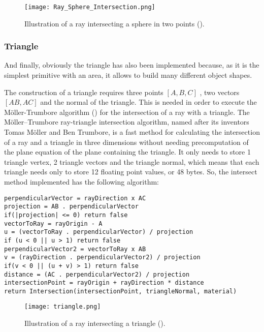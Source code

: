 \begin{figure}[H]
	\centering
	\caption{Illustration of a ray intersecting a sphere in two points (\cite{SphereRayIntersection}).}
	\label{Sphere.}
	\texttt{[image: Ray\_Sphere\_Intersection.png]}
\end{figure}

\subsubsection{Triangle}

\par
And finally, obviously the triangle has also been implemented because, as it is the simplest primitive with an area, it allows to build many different object shapes.

\par
The construction of a triangle requires three points
$[A, B, C]$
, two vectors
$[AB, AC]$
and the normal of the triangle.
This is needed in order to execute the Möller-Trumbore algorithm (\cite{RayTriangleIntersection}) for the intersection of a ray with a triangle.
The Möller–Trumbore ray-triangle intersection algorithm, named after its inventors Tomas Möller and Ben Trumbore, is a fast method for calculating the intersection of a ray and a triangle in three dimensions without needing precomputation of the plane equation of the plane containing the triangle.
It only needs to store 1 triangle vertex, 2 triangle vectors and the triangle normal, which means that each triangle needs only to store 12 floating point values, or 48 bytes.
So, the intersect method implemented has the following algorithm:

\begin{lstlisting}[caption={Algorithm of Ray triangle intersection (\cite{LightHouseRayTriangle})}, captionpos=b, label=Triangle]
perpendicularVector = rayDirection x AC
projection = AB . perpendicularVector
if(|projection| <= 0) return false
vectorToRay = rayOrigin - A
u = (vectorToRay . perpendicularVector) / projection
if (u < 0 || u > 1) return false
perpendicularVector2 = vectorToRay x AB
v = (rayDirection . perpendicularVector2) / projection
if(v < 0 || (u + v) > 1) return false
distance = (AC . perpendicularVector2) / projection
intersectionPoint = rayOrigin + rayDirection * distance
return Intersection(intersectionPoint, triangleNormal, material)
\end{lstlisting}

\begin{figure}[H]
	\centering
	\caption{Illustration of a ray intersecting a triangle (\cite{TriangleRayIntersection}).}
	\label{Sphere.}
	\texttt{[image: triangle.png]}
\end{figure}

